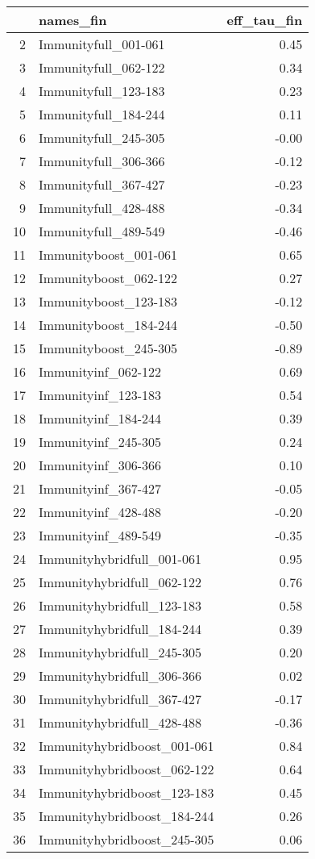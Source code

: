 \begin{table}[ht]
\centering
\begin{tabular}{rlr}
  \hline
 & names\_fin & eff\_tau\_fin \\ 
  \hline
2 & Immunityfull\_001-061 & 0.45 \\ 
  3 & Immunityfull\_062-122 & 0.34 \\ 
  4 & Immunityfull\_123-183 & 0.23 \\ 
  5 & Immunityfull\_184-244 & 0.11 \\ 
  6 & Immunityfull\_245-305 & -0.00 \\ 
  7 & Immunityfull\_306-366 & -0.12 \\ 
  8 & Immunityfull\_367-427 & -0.23 \\ 
  9 & Immunityfull\_428-488 & -0.34 \\ 
  10 & Immunityfull\_489-549 & -0.46 \\ 
  11 & Immunityboost\_001-061 & 0.65 \\ 
  12 & Immunityboost\_062-122 & 0.27 \\ 
  13 & Immunityboost\_123-183 & -0.12 \\ 
  14 & Immunityboost\_184-244 & -0.50 \\ 
  15 & Immunityboost\_245-305 & -0.89 \\ 
  16 & Immunityinf\_062-122 & 0.69 \\ 
  17 & Immunityinf\_123-183 & 0.54 \\ 
  18 & Immunityinf\_184-244 & 0.39 \\ 
  19 & Immunityinf\_245-305 & 0.24 \\ 
  20 & Immunityinf\_306-366 & 0.10 \\ 
  21 & Immunityinf\_367-427 & -0.05 \\ 
  22 & Immunityinf\_428-488 & -0.20 \\ 
  23 & Immunityinf\_489-549 & -0.35 \\ 
  24 & Immunityhybridfull\_001-061 & 0.95 \\ 
  25 & Immunityhybridfull\_062-122 & 0.76 \\ 
  26 & Immunityhybridfull\_123-183 & 0.58 \\ 
  27 & Immunityhybridfull\_184-244 & 0.39 \\ 
  28 & Immunityhybridfull\_245-305 & 0.20 \\ 
  29 & Immunityhybridfull\_306-366 & 0.02 \\ 
  30 & Immunityhybridfull\_367-427 & -0.17 \\ 
  31 & Immunityhybridfull\_428-488 & -0.36 \\ 
  32 & Immunityhybridboost\_001-061 & 0.84 \\ 
  33 & Immunityhybridboost\_062-122 & 0.64 \\ 
  34 & Immunityhybridboost\_123-183 & 0.45 \\ 
  35 & Immunityhybridboost\_184-244 & 0.26 \\ 
  36 & Immunityhybridboost\_245-305 & 0.06 \\ 
   \hline
\end{tabular}
\end{table}
